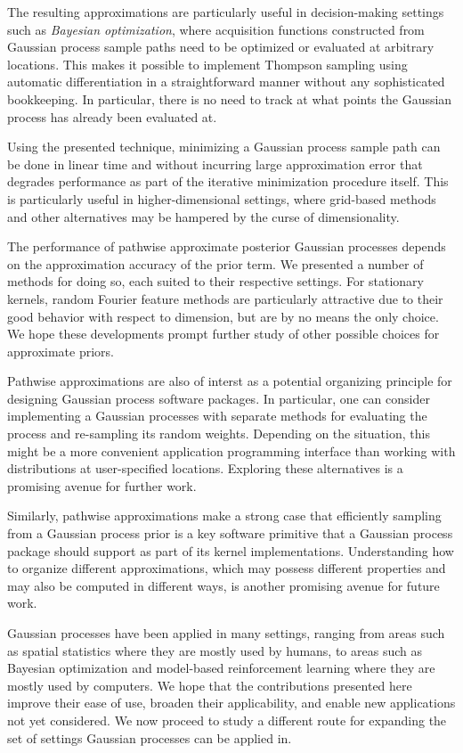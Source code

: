 \documentclass[11pt]{book}
\begin{document}
The resulting approximations are particularly useful in decision-making settings such as \emph{Bayesian optimization}, where acquisition functions constructed from Gaussian process sample paths need to be optimized or evaluated at arbitrary locations.
This makes it possible to implement Thompson sampling using automatic differentiation in a straightforward manner without any sophisticated bookkeeping.
In particular, there is no need to track at what points the Gaussian process has already been evaluated at.

Using the presented technique, minimizing a Gaussian process sample path can be done in linear time and without incurring large approximation error that degrades performance as part of the iterative minimization procedure itself.
This is particularly useful in higher-dimensional settings, where grid-based methods and other alternatives may be hampered by the curse of dimensionality.

The performance of pathwise approximate posterior Gaussian processes depends on the approximation accuracy of the prior term.
We presented a number of methods for doing so, each suited to their respective settings.
For stationary kernels, random Fourier feature methods are particularly attractive due to their good behavior with respect to dimension, but are by no means the only choice.
We hope these developments prompt further study of other possible choices for approximate priors.

Pathwise approximations are also of interst as a potential organizing principle for designing Gaussian process software packages.
In particular, one can consider implementing a Gaussian processes with separate methods for evaluating the process and re-sampling its random weights.
Depending on the situation, this might be a more convenient application programming interface than working with distributions at user-specified locations.
Exploring these alternatives is a promising avenue for further work.

Similarly, pathwise approximations make a strong case that efficiently sampling from a Gaussian process prior is a key software primitive that a Gaussian process package should support as part of its kernel implementations. 
Understanding how to organize different approximations, which may possess different properties and may also be computed in different ways, is another promising avenue for future work.

Gaussian processes have been applied in many settings, ranging from areas such as spatial statistics where they are mostly used by humans, to areas such as Bayesian optimization and model-based reinforcement learning where they are mostly used by computers.
We hope that the contributions presented here improve their ease of use, broaden their applicability, and enable new applications not yet considered.
We now proceed to study a different route for expanding the set of settings Gaussian processes can be applied in.
\end{document}
